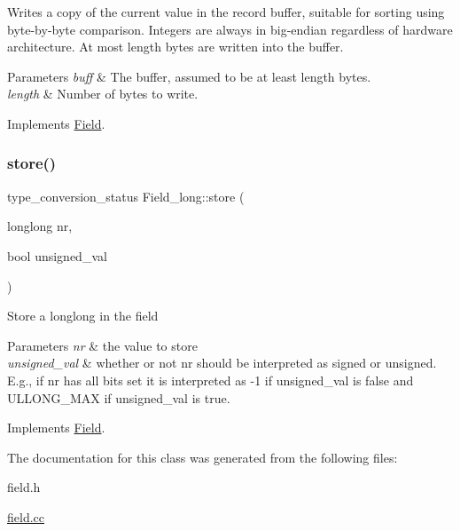 Writes a copy of the current value in the record buffer, suitable for sorting using byte-\/by-\/byte comparison. Integers are always in big-\/endian regardless of hardware architecture. At most length bytes are written into the buffer.


\begin{DoxyParams}{Parameters}
{\em buff} & The buffer, assumed to be at least length bytes.\\
\hline
{\em length} & Number of bytes to write. \\
\hline
\end{DoxyParams}


Implements \mbox{\hyperlink{classField_af3bc27d237b6ae6ef3dc7a2aec3d79ac}{Field}}.

\mbox{\label{classField__long_a32635a2020febffbd53ac8ff1e7b74f2}} 
\subsubsection{\texorpdfstring{store()}{store()}}
{\footnotesize\ttfamily type\+\_\+conversion\+\_\+status Field\+\_\+long\+::store (\begin{DoxyParamCaption}\item[{longlong}]{nr,  }\item[{bool}]{unsigned\+\_\+val }\end{DoxyParamCaption})\hspace{0.3cm}{\ttfamily [virtual]}}

Store a longlong in the field


\begin{DoxyParams}{Parameters}
{\em nr} & the value to store \\
\hline
{\em unsigned\+\_\+val} & whether or not \textquotesingle{}nr\textquotesingle{} should be interpreted as signed or unsigned. E.\+g., if \textquotesingle{}nr\textquotesingle{} has all bits set it is interpreted as -\/1 if unsigned\+\_\+val is false and U\+L\+L\+O\+N\+G\+\_\+\+M\+AX if unsigned\+\_\+val is true. \\
\hline
\end{DoxyParams}


Implements \mbox{\hyperlink{classField}{Field}}.



The documentation for this class was generated from the following files\+:\begin{DoxyCompactItemize}
\item 
field.\+h\item 
\mbox{\hyperlink{field_8cc}{field.\+cc}}\end{DoxyCompactItemize}
